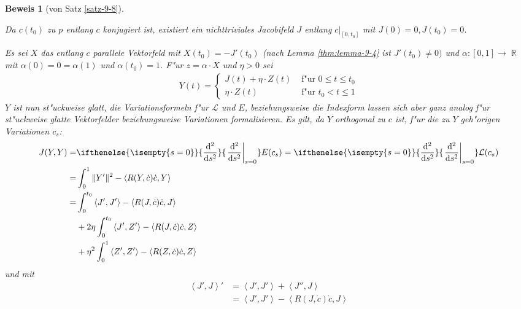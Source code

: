 \documentclass[paper=A4, twoside, chapterprefix=true, bibliography=totoc, headsepline]{scrbook}
\DeclareMathOperator{\R}{\mathbb{R}}
\newcommand{\dop}{\mathrm{d}}
\newcommand{\difffrac}[3][]{\ifthenelse{\isempty{#1}}{\frac{\dop #2}{\dop #3}}{\left. \frac{\dop #2}{\dop #3} \right|_{#1}}}
\theoremstyle{plain}
\theoremstyle{nonumberplain}
\newtheorem{bew}{Beweis}
\theoremstyle{empty}
\theoremstyle{break}
\begin{document}
\begin{bew}[von Satz \ref{satz-9-8}]
\begin{enumerate}[label=(\roman*),leftmargin=*,widest=ii]
\begin{description}

      \begin{description}[font=\normalfont\itshape]
      \item[Beweis der Existenz von $Y$:] Da $c(t_0)$ zu $p$ entlang $c$ konjugiert ist, existiert ein nichttriviales Jacobifeld $J$ entlang $c|_{[0,t_0]}$ mit $J(0) = 0, J(t_0) = 0$.
      \end{description}
      Es sei $X$ das entlang $c$ parallele Vektorfeld mit $X(t_0) = -J'(t_0)$
      (nach Lemma \ref{thm:lemma-9-4} ist $J'(t_0) \neq 0)$ und
      $\alpha\colon[0,1] \to \R$ mit $\alpha(0) = 0 = \alpha(1)$ und
      $\alpha(t_0) = 1$. F"ur $z = \alpha \cdot X$ und $\eta > 0$ sei
      \begin{align*}
        Y(t) =
        \begin{cases}
          J(t) + \eta \cdot Z(t) & \text{ f"ur } 0 \leq t \leq t_0\\
          \eta \cdot Z(t) & \text{ f"ur } t_0 < t \leq 1
        \end{cases}
      \end{align*}
      $Y$ ist nun st"uckweise glatt, die Variationsformeln f"ur $\mathcal L$ und $E$, beziehungsweise die Indexform lassen sich aber ganz analog f"ur st"uckweise glatte Vektorfelder beziehungsweise Variationen formalisieren.
      Es gilt, da $Y$ orthogonal zu $c$ ist, f"ur die zu $Y$ geh"origen Variationen $c_s$:
      \begin{align*}
        J(Y,Y) = & \difffrac[s=0]{^2}{s^2}E(c_s) = \difffrac[s=0]{^2}{s^2} \mathcal L(c_s)\\
        = &{} \int_0^1\|Y'\|^2 - \left<R(Y,\dot c)\dot c,Y\right>\\
        = &{} \int_0^{t_0}\left<J',J'\right> - \left<R(J,\dot c)\dot c,J\right>\\ 
        &+ 2 \eta\int_0^{t_0} \left< J',Z'\right> - \left< R(J,\dot c)\dot c,Z\right>\\
        & + \eta^2 \int_0^1 \left<Z',Z'\right> - \left<R(Z,\dot c)\dot c,Z\right>
      \end{align*}
      und mit 
      \begin{align*}
        \left<J',J\right>' &= \left<J',J'\right> + \left<J'',J\right> \\
      	&= \left<J',J'\right> - \left<R(J,\dot c)\dot c,J\right>\\

\end{align*}
\end{description}
\end{enumerate}
\end{bew}
\end{document}
